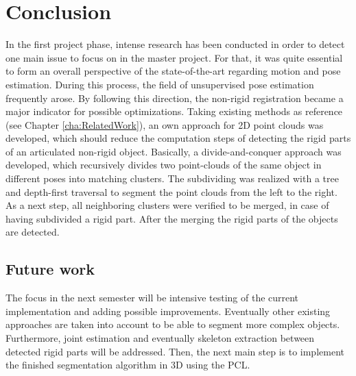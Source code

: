 \chapter{Conclusion}
\label{cha:Closing}

In the first project phase, intense research has been conducted in order to detect one main issue to focus on in the master project. For that, it was quite essential to form an overall perspective of the state-of-the-art regarding motion and pose estimation. During this process, the field of unsupervised pose estimation frequently arose. By following this direction, the non-rigid registration became a major indicator for possible optimizations. Taking existing methods as reference (see Chapter \ref{cha:RelatedWork}), an own approach for 2D point clouds was developed, which should reduce the computation steps of detecting the rigid parts of an articulated non-rigid object. Basically, a divide-and-conquer approach was developed, which recursively divides two point-clouds of the same object in different poses into matching clusters. The subdividing was realized with a tree and depth-first traversal to segment the point clouds from the left to the right. As a next step, all neighboring clusters were verified to be merged, in case of having subdivided a rigid part. After the merging the rigid parts of the objects are detected. 
	
\section{Future work}
	
The focus in the next semester will be intensive testing of the current implementation and adding possible improvements. Eventually other existing approaches are taken into account to be able to segment more complex objects. Furthermore, joint estimation and eventually skeleton extraction between detected rigid parts will be addressed. Then, the next main step is to implement the finished segmentation algorithm in 3D using the PCL.
